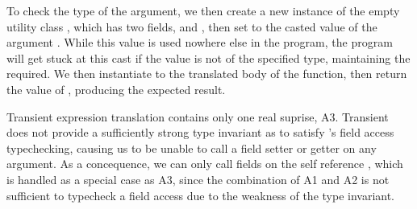 \documentclass[a4paper,USenglish]{tex/lipics-v2016}
\begin{document}
To check the type of the argument, we then create a new instance of the empty utility class , which has two fields,  and , then set  to the casted value of the argument \x. While this value is used nowhere else in the program, the program will get stuck at this cast if the value is not of the specified type, maintaining the required. We then instantiate  to the translated body of the function, then return the value of , producing the expected result. 


\begin{mathpar}





\end{mathpar}

Transient expression translation contains only one real suprise, A3. Transient does not provide a sufficiently strong type invariant as to satisfy \kafka's field access typechecking, causing us to be unable to call a field setter or getter on any argument. As a concequence, we can only call fields on the self reference \this, which is handled as a special case as A3, since the combination of A1 and A2 is not sufficient to typecheck a field access due to the weakness of the type invariant.

\begin{mathpar}

\end{mathpar}
\end{document}
